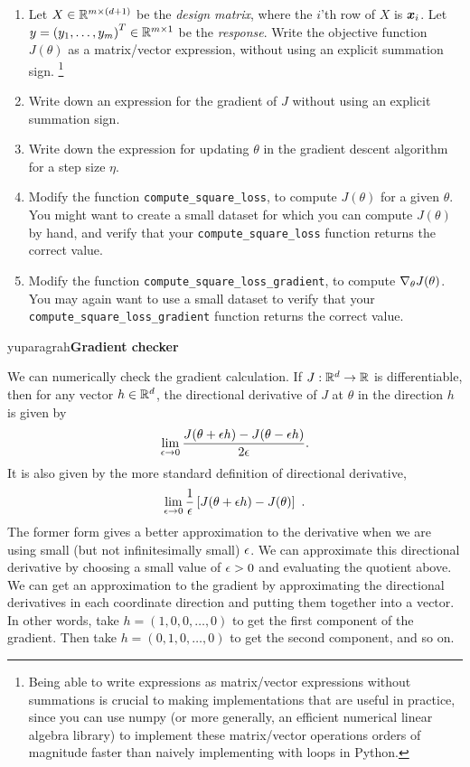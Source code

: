 \documentclass{article}
\begin{document}
\begin{enumerate}
  \setcounter{enumi}{\value{saveenum}}
\item Let $X\in\mathbb{R}^{m\times\left(d+1\right)}$ be the \emph{design matrix}, where the $i$'th row of $X$ is $\boldsymbol{x}_{i}$. Let $y=\left(y_{1},\ldots,y_{m}\right)^{T}\in\mathbb{R}^{m\times1}$
be the \emph{response}. Write the objective function $J(\theta)$ as
a matrix/vector expression, without using an explicit summation sign.
\footnote{Being able to write expressions as matrix/vector expressions without
summations is crucial to making implementations that are useful in
practice, since you can use numpy (or more generally, an efficient
numerical linear algebra library) to implement these matrix/vector
operations orders of magnitude faster than naively implementing with
loops in Python.} 

\item Write down an expression for the gradient of $J$ without using an explicit summation sign. 

\item Write down the expression for updating $\theta$ in the gradient descent
algorithm for a step size $\eta$.

\item Modify the function \texttt{compute\_square\_loss}, to compute $J(\theta)$
for a given $\theta$. You might want to create a small dataset for
which you can compute $J(\theta)$ by hand, and verify that your \texttt{compute\_square\_loss}
function returns the correct value.

\item Modify the function \texttt{compute\_square\_loss\_gradient}, to compute
$\nabla_{\theta}J(\theta)$. You may again want to use a small dataset
to verify that your \texttt{compute\_square\_loss\_gradient} function
returns the correct value.
\setcounter{saveenum}{\value{enumi}}
\end{enumerate}

yuparagrah{\bf Gradient checker}

We can numerically check the
gradient calculation. If $J:\mathbb{R}^{d}\to\mathbb{R}$ is differentiable,
then for any vector $h\in\mathbb{R}^{d}$, the directional derivative
of $J$ at $\theta$ in the direction $h$ is given by
\[
\lim_{{\epsilon}\to0}\frac{J(\theta+{\epsilon} h)-J(\theta-{\epsilon} h)}{2{\epsilon}}.
\]
It is also given by the more standard definition of directional
derivative, $$\lim_{{\epsilon}\to0}\frac{1}{{\epsilon}}\left[J(\theta+{\epsilon} h)-J(\theta)\right] \ .$$
The former form gives a better approximation to the derivative when
we are using small (but not infinitesimally small) ${\epsilon}$. We can approximate this directional derivative by choosing a small
value of ${\epsilon}>0$ and evaluating the quotient above. We can get an
approximation to the gradient by approximating the directional derivatives
in each coordinate direction and putting them together into a vector.
In other words, take $h=\left(1,0,0,\ldots,0\right)$ to get the first
component of the gradient. Then take $h=(0,1,0,\ldots,0)$ to get
the second component, and so on. 
\end{document}
